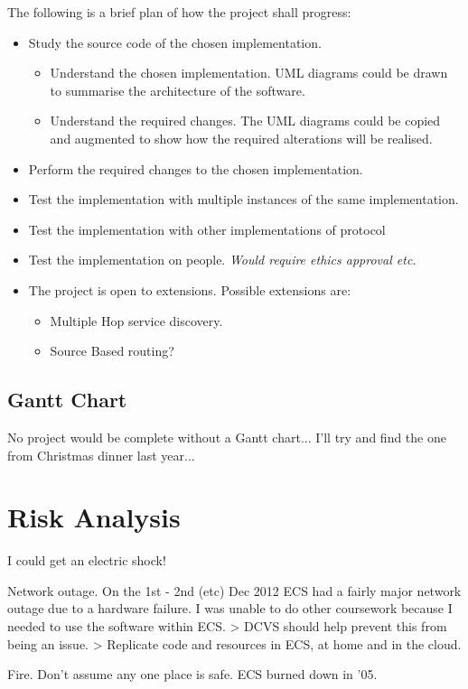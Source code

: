 \documentclass[12pt]{report}
\begin{document}
\em 

The following is a brief plan of how the project shall progress:

\begin{itemize}

\item Study the source code of the chosen implementation.

\begin{itemize}

\item Understand the chosen implementation.
UML diagrams could be drawn to summarise the architecture of the software. 

\item Understand the required changes.
The UML diagrams could be copied and augmented to show how the required
alterations will be realised. 

\end{itemize}

\item Perform the required changes to the chosen implementation.
\item Test the implementation with multiple instances of the same implementation.
\item Test the implementation with other implementations of protocol 
\item Test the implementation on people. \em Would require ethics approval etc. \em
{}
\item The project is open to extensions. Possible extensions are:

\begin{itemize}
\item Multiple Hop service discovery.
\item Source Based routing?
\end{itemize}

\end{itemize}

\section{Gantt Chart}
No project would be complete without a Gantt chart... I'll try and find the one
from Christmas dinner last year...

\chapter{Risk Analysis}

I could get an electric shock!

Network outage. On the 1st - 2nd (etc) Dec 2012 ECS had a fairly major network
outage due to a hardware failure. I was unable to do other coursework because I
needed to use the software within ECS. 
 > DCVS should help prevent this from being an issue. 
 > Replicate code and resources in ECS, at home and in the cloud. 

Fire. Don't assume any one place is safe. ECS burned down in '05.
\end{document}
